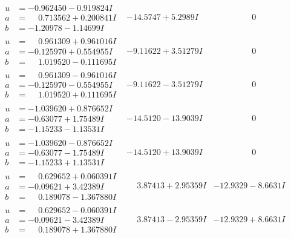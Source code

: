 \documentclass[1p]{elsarticle_modified}
\theoremstyle{definition}
\begin{document}
$$\begin{array}{c|c|c}
\begin{aligned}
u &= -0.962450 - 0.919824 I \\
a &= \phantom{-}0.713562 + 0.200841 I \\
b &= -1.20978 - 1.14699 I\end{aligned}
 & -14.5747 + 5.2989 I & \phantom{-0.000000 } 0 \\ \hline\begin{aligned}
u &= \phantom{-}0.961309 + 0.961016 I \\
a &= -0.125970 + 0.554955 I \\
b &= \phantom{-}1.019520 - 0.111695 I\end{aligned}
 & -9.11622 + 3.51279 I & \phantom{-0.000000 } 0 \\ \hline\begin{aligned}
u &= \phantom{-}0.961309 - 0.961016 I \\
a &= -0.125970 - 0.554955 I \\
b &= \phantom{-}1.019520 + 0.111695 I\end{aligned}
 & -9.11622 - 3.51279 I & \phantom{-0.000000 } 0 \\ \hline\begin{aligned}
u &= -1.039620 + 0.876652 I \\
a &= -0.63077 + 1.75489 I \\
b &= -1.15233 - 1.13531 I\end{aligned}
 & -14.5120 - 13.9039 I & \phantom{-0.000000 } 0 \\ \hline\begin{aligned}
u &= -1.039620 - 0.876652 I \\
a &= -0.63077 - 1.75489 I \\
b &= -1.15233 + 1.13531 I\end{aligned}
 & -14.5120 + 13.9039 I & \phantom{-0.000000 } 0 \\ \hline\begin{aligned}
u &= \phantom{-}0.629652 + 0.060391 I \\
a &= -0.09621 + 3.42389 I \\
b &= \phantom{-}0.189078 - 1.367880 I\end{aligned}
 & \phantom{-}3.87413 + 2.95359 I & -12.9329 - 8.6631 I \\ \hline\begin{aligned}
u &= \phantom{-}0.629652 - 0.060391 I \\
a &= -0.09621 - 3.42389 I \\
b &= \phantom{-}0.189078 + 1.367880 I\end{aligned}
 & \phantom{-}3.87413 - 2.95359 I & -12.9329 + 8.6631 I \\ \hline\begin{aligned}

\end{aligned}
\end{array}$$
\end{document}
